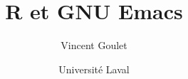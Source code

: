 \documentclass[11pt,french]{memoir}
\title{R et GNU Emacs}
\author{Vincent Goulet}
\date{Université Laval}
\begin{document}
\frontmatter



\tableofcontents*

\mainmatter



\end{document}
